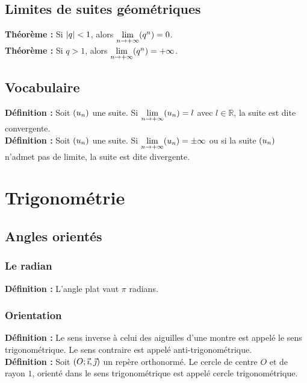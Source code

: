 \documentclass[a4paper,titlepage]{article}
\let\oldsection\section
\renewcommand\section{\clearpage\oldsection}
\let\oldleft\left
\renewcommand{\left}{\mathopen{}\mathclose\bgroup\oldleft}
\let\oldright\right
\renewcommand{\right}{\aftergroup\egroup\oldright}
\begin{document}
    \subsection{Limites de suites géométriques}
        \textbf{Théorème :} Si $\left|q\right|<1$, alors $\lim\limits_{n\to+\infty}\left(q^{n}\right)=0$.
        \\
        \textbf{Théorème :} Si $q>1$, alors $\lim\limits_{n\to+\infty}\left(q^{n}\right)=+\infty$.
    \subsection{Vocabulaire}
        \textbf{Définition :} Soit $\left(u_{n}\right)$ une suite. Si $\lim\limits_{n\to+\infty}\left(u_{n}\right)=l$ avec $l\in\mathbb{R}$, la suite est dite convergente.
        \\
        \textbf{Définition :} Soit $\left(u_{n}\right)$ une suite. Si $\lim\limits_{n\to+\infty}\left(u_{n}\right)=\pm\infty$ ou si la suite $\left(u_{n}\right)$ n’admet pas de limite, la suite est dite divergente.
\section{Trigonométrie}
    \subsection{Angles orientés}
        \subsubsection{Le radian}
            \textbf{Définition :} L’angle plat vaut $\pi$ radians.
        \subsubsection{Orientation}
            \textbf{Définition :} Le sens inverse à celui des aiguilles d’une montre est appelé le sens trigonométrique. Le sens contraire est appelé anti-trigonométrique.
            \\
            \textbf{Définition :} Soit $\left(O;\vec{\imath},\vec{\jmath}\right)$ un repère orthonormé. Le cercle de centre $O$ et de rayon $1$, orienté dans le sens trigonométrique est appelé cercle trigonométrique.
\end{document}
